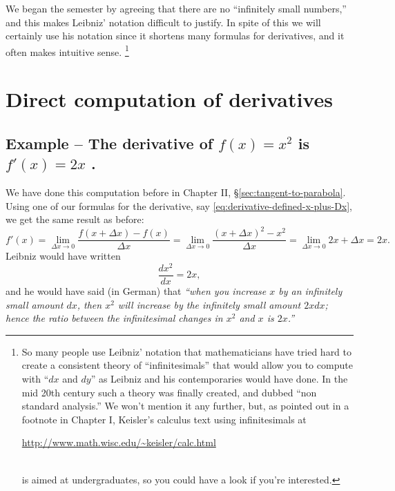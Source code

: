 We began the semester by agreeing that there are no ``infinitely small
numbers,'' and this makes Leibniz' notation difficult to justify.  In
spite of this we will certainly use his notation since it shortens
many formulas for derivatives, and it often makes intuitive sense.%
\footnote{So many people use Leibniz' notation that mathematicians have
  tried hard to create a consistent theory of ``infinitesimals'' that
  would allow you to compute with ``$dx$ and $dy$'' as Leibniz and his
  contemporaries would have done.  In the mid 20th century such a
  theory was finally created, and dubbed ``non standard analysis.'' We
  won't mention it any further, but, as pointed out in a footnote in
  Chapter I, Keisler's calculus text using infinitesimals at\\
  \centerline{\url{http://www.math.wisc.edu/~keisler/calc.html}}\\
  is aimed at undergraduates, so you could have a look if you're
  interested.}




\section{Direct computation of derivatives}
\label{sec:direct-derivative-computation}

\subsection{Example -- The derivative of $f(x)= x^2$ is $f'(x) = 2x$  . }
We have done this computation before in Chapter II,
\S\ref{sec:tangent-to-parabola}.  Using one of our formulas for the
derivative, say \eqref{eq:derivative-defined-x-plus-Dx}, we get the
same result as before:
\[
f'(x)= \lim_{{\Delta x}\to 0} \frac{f(x+{\Delta x})-f(x)}{{\Delta x}}
= \lim_{{\Delta x}\to 0}
\frac{(x+{\Delta x})^2-x^2}{{\Delta x}}=\lim_{{\Delta x}\to 0} 2x+{\Delta x} =2x.
\]
Leibniz would have written
\[
\frac{dx^2}{dx} = 2x,
\]
and he would have said (in German) that {\slshape ``when you increase
  $x$ by an infinitely small amount $dx$, then $x^2$ will increase by
  the infinitely small amount $2xdx$; hence the ratio between the
  infinitesimal changes in $x^2$ and $x$ is $2x$.''}

